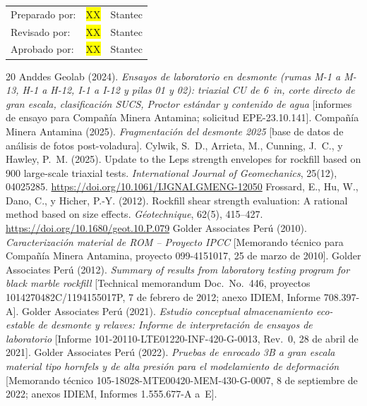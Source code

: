 \documentclass[11pt,letterpaper]{article}
\begin{document}
\vspace{6pt}\noindent\begin{tabular}{@{}lll@{}}
Preparado por: & \colorbox{yellow}{XX} & Stantec\\
Revisado por: & \colorbox{yellow}{XX} & Stantec\\
Aprobado por: & \colorbox{yellow}{XX} & Stantec\\
\end{tabular}

\begin{thebibliography}{20}\small
{} Anddes Geolab (2024). \emph{Ensayos de laboratorio en desmonte (rumas M-1 a M-13, H-1 a H-12, I-1 a I-12 y pilas 01 y 02): triaxial CU de 6~in, corte directo de gran escala, clasificación SUCS, Proctor estándar y contenido de agua} [informes de ensayo para Compañía Minera Antamina; solicitud EPE-23.10.141].
 Compañía Minera Antamina (2025). \emph{Fragmentación del desmonte 2025} [base de datos de análisis de fotos post-voladura].
 Cylwik, S.~D., Arrieta, M., Cunning, J.~C., y Hawley, P.~M. (2025). Update to the Leps strength envelopes for rockfill based on 900 large-scale triaxial tests. \emph{International Journal of Geomechanics}, 25(12), 04025285. \url{https://doi.org/10.1061/IJGNAI.GMENG-12050}
 Frossard, E., Hu, W., Dano, C., y Hicher, P.-Y. (2012). Rockfill shear strength evaluation: A rational method based on size effects. \emph{Géotechnique}, 62(5), 415--427. \url{https://doi.org/10.1680/geot.10.P.079}
 Golder Associates Perú (2010). \emph{Caracterización material de ROM -- Proyecto IPCC} [Memorando técnico para Compañía Minera Antamina, proyecto 099-4151017, 25 de marzo de 2010].
 Golder Associates Perú (2012). \emph{Summary of results from laboratory testing program for black marble rockfill} [Technical memorandum Doc.~No.~446, proyectos 1014270482C/1194155017P, 7 de febrero de 2012; anexo IDIEM, Informe 708.397-A].
 Golder Associates Perú (2021). \emph{Estudio conceptual almacenamiento eco-estable de desmonte y relaves: Informe de interpretación de ensayos de laboratorio} [Informe 101-20110-LTE01220-INF-420-G-0013, Rev.~0, 28 de abril de 2021].
 Golder Associates Perú (2022). \emph{Pruebas de enrocado 3B a gran escala material tipo hornfels y de alta presión para el modelamiento de deformación} [Memorando técnico 105-18028-MTE00420-MEM-430-G-0007, 8 de septiembre de 2022; anexos IDIEM, Informes 1.555.677-A a~E].

\end{thebibliography}
\end{document}
